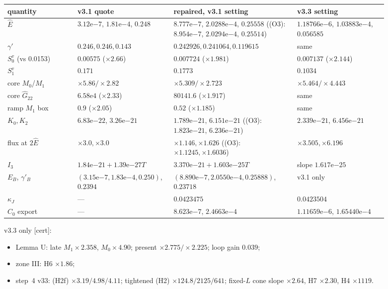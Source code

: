 \documentclass[10pt]{article}
\newcommand{\cert}{\textup{[cert]}}
\newcommand{\Ghat}{\hat G}
\begin{document}
{\scriptsize
\begin{longtable}{p{0.17\linewidth}p{0.2\linewidth}p{0.3\linewidth}p{0.22\linewidth}}\toprule
quantity & v3.1 quote & repaired, v3.1 setting & v3.3 setting\\\midrule\endhead
$\hat E$ & $3.12\mathrm{e}{-7}$, $1.81\mathrm{e}{-4}$, $0.248$ & $8.777\mathrm{e}{-7}$, $2.0288\mathrm{e}{-4}$, $0.25558$ ((O3): $8.954\mathrm{e}{-7}$, $2.0294\mathrm{e}{-4}$, $0.25514$) & $1.18766\mathrm{e}{-6}$, $1.03883\mathrm{e}{-4}$, $0.056585$\\
$\gamma'$ & $0.246,0.246,0.143$ & $0.242926,0.241064,0.119615$ & same\\
$S_0^v$ (vs 0.0153) & $0.00575$ ($\times2.66$) & $0.007724$ ($\times1.981$) & $0.007137$ ($\times2.144$)\\
$S_1^v$ & $0.171$ & $0.1773$ & $0.1034$\\
core $M_0$/$M_1$ & $\times5.86/\times2.82$ & $\times5.309/\times2.723$ & $\times5.464/\times4.443$\\
core $\Ghat_{22}$ & $6.58\mathrm{e}4$ ($\times2.33$) & $80141.6$ ($\times1.917$) & same\\
ramp $M_1$ box & $0.9$ ($\times2.05$) & $0.52$ ($\times1.185$) & same\\
$K_0,K_2$ & $6.83\mathrm{e}{-22}$, $3.26\mathrm{e}{-21}$ & $1.789\mathrm{e}{-21}$, $6.151\mathrm{e}{-21}$ ((O3): $1.823\mathrm{e}{-21}$, $6.236\mathrm{e}{-21}$) & $2.339\mathrm{e}{-21}$, $6.456\mathrm{e}{-21}$\\
flux at $2\hat E$ & $\times3.0,\times3.0$ & $\times1.146,\times1.626$ ((O3): $\times1.1245,\times1.6036$) & $\times3.505,\times6.196$\\
$I_3$ & $1.84\mathrm{e}{-21}+1.39\mathrm{e}{-27}T$ & $3.370\mathrm{e}{-21}+1.603\mathrm{e}{-25}T$ & slope $1.617\mathrm{e}{-25}$\\
$E_B$, $\gamma'_B$ & $(3.15\mathrm{e}{-7},1.83\mathrm{e}{-4},0.250)$, $0.2394$ & $(8.890\mathrm{e}{-7},2.0550\mathrm{e}{-4},0.25888)$, $0.23718$ & v3.1 only\\
$\kappa_J$ & --- & $0.0423475$ & $0.0423504$\\
$C_0$ export & --- & $8.623\mathrm{e}{-7}$, $2.4663\mathrm{e}{-4}$ & $1.11659\mathrm{e}{-6}$, $1.65440\mathrm{e}{-4}$\\\bottomrule
\end{longtable}}
v3.3 only \cert:
\begin{itemize}
\item Lemma U: late $M_1\times2.358$, $M_0\times4.90$; present $\times2.775/\times2.225$; loop gain $0.039$;
\item zone III: H6 $\times1.86$;
\item step~4 v33: (H2f) $\times3.19/4.98/4.11$; tightened (H2) $\times124.8/2125/641$; fixed-$L$ cone slope $\times2.64$, H7 $\times2.30$, H4 $\times1119$.
\end{itemize}
\end{document}
